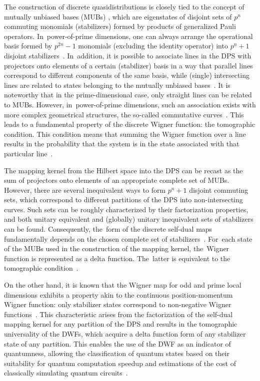 \documentclass[quantumrep,article,accept,pdftex,moreauthors]{Definitions/mdpi}
\begin{document}
The construction of discrete quasidistributions is closely tied to the concept
of mutually unbiased bases (MUBs) \cite{ivanovic,mubs1,mubs2}, which are
eigenstates of disjoint sets of $p^{n}$ commuting monomials (stabilizers) formed
by products of  generalized Pauli operators. In~power-of-prime dimensions, one
can always arrange the operational basis formed by $p^{2n}-1$ monomials
(excluding the identity operator) into $p^{n}+1$ disjoint stabilizers~\cite{Bandyopadhyay2002}. In~addition, it is possible to associate lines in the
DPS with projectors onto elements of a certain (stabilizer) basis in a way that
parallel lines correspond to different components of the same basis, while
(single) intersecting lines are related to states belonging to the mutually
unbiased bases~\cite{wootters1}. It is noteworthy that in the prime-dimensional
case, only straight lines can be related to MUBs.  However, in~power-of-prime
dimensions, such an association exists with more complex geometrical structures,
the so-called commutative curves~\cite{GS2,JPA09}. This leads to a fundamental
property of the discrete Wigner function: the tomographic condition. This
condition means that summing the Wigner function over a line results in the
probability that the system is in the state associated with that particular line~\cite{wootters1, gibbons}.

The mapping kernel from the Hilbert space into the DPS can be recast as the sum of
projectors onto elements of an appropriate complete set of MUBs.  However, there
are several inequivalent ways to form $p^{n}+1$ disjoint commuting sets, which
correspond to different partitions of the DPS into non-intersecting curves. Such
sets can be roughly characterized by their factorization properties, and both
unitary equivalent and (globally) unitary inequivalent sets of stabilizers can
be found. Consequently, the~form of the discrete self-dual maps fundamentally
depends on the chosen complete set of stabilizers~\cite{Bjork2007}. For~each
state of the MUBs used in the construction of the mapping kernel, the~Wigner
function is represented as a delta function. The~latter is equivalent to the
tomographic condition~\cite{gibbons,galvao,cormick,wootters1,DFW12}.

On the other hand, it is known that the Wigner map for odd and prime local dimensions
exhibits a property akin to the continuous position-momentum Wigner function:
only stabilizer states correspond to non-negative Wigner functions~\cite{gross}.
This characteristic arises from the factorization of the self-dual mapping
kernel for any partition of the DPS and results in the tomographic universality of
the DWFs, which acquire a delta function form of any stabilizer state of any
partition. This enables the use of the DWF as an indicator of quantumness,
allowing the classification of quantum states based on their suitability for
quantum computation speedup and estimations of the cost of classically simulating
quantum circuits~\cite{Raus17,UniqueWF, cohomo, contextMagic, WignerContext}.
\end{document}
